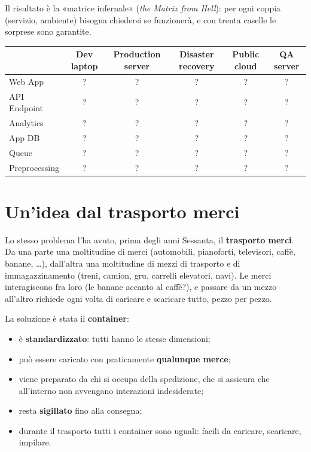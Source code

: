 Il risultato è la «matrice infernale» (\textit{the Matrix from Hell}): per ogni coppia (servizio, ambiente) bisogna
chiedersi se funzionerà, e con trenta caselle le sorprese sono garantite.

\begin{center}
\renewcommand{\arraystretch}{1.15}
\begin{tabular}{l|ccccc}
 & \textbf{Dev laptop} & \textbf{Production server} & \textbf{Disaster recovery} & \textbf{Public cloud} &
   \textbf{QA server} \\
\hline
Web App & ? & ? & ? & ? & ? \\
API Endpoint & ? & ? & ? & ? & ? \\
Analytics & ? & ? & ? & ? & ? \\
App DB & ? & ? & ? & ? & ? \\
Queue & ? & ? & ? & ? & ? \\
Preprocessing & ? & ? & ? & ? & ? \\
\end{tabular}
\end{center}

\section{Un'idea dal trasporto merci}

Lo stesso problema l'ha avuto, prima degli anni Sessanta, il \textbf{trasporto merci}. Da una parte una moltitudine di
merci (automobili, pianoforti, televisori, caffè, banane, \ldots), dall'altra una moltitudine di mezzi di trasporto e di
immagazzinamento (treni, camion, gru, carrelli elevatori, navi). Le merci interagiscono fra loro (le banane accanto al
caffè?), e passare da un mezzo all'altro richiede ogni volta di caricare e scaricare tutto, pezzo per pezzo.

La soluzione è stata il \textbf{container}:

\begin{itemize}
  \item è \textbf{standardizzato}: tutti hanno le stesse dimensioni;
  \item può essere caricato con praticamente \textbf{qualunque merce};
  \item viene preparato da chi si occupa della spedizione, che si assicura che all'interno non avvengano interazioni
        indesiderate;
  \item resta \textbf{sigillato} fino alla consegna;
  \item durante il trasporto tutti i container sono uguali: facili da caricare, scaricare, impilare.
\end{itemize}

